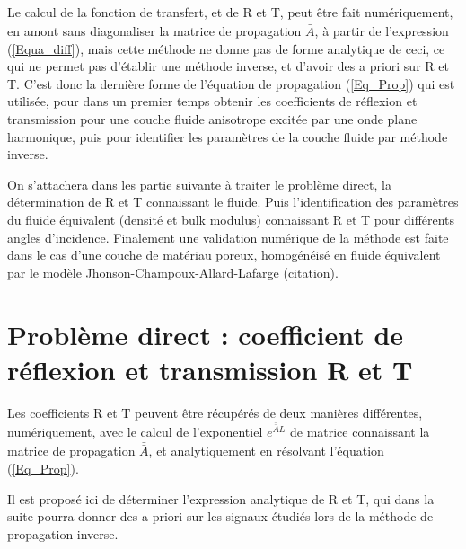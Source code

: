 \documentclass[12pt]{report}
\begin{document}
    Le calcul de la fonction de transfert, et de R et T, peut être fait numériquement, en amont sans diagonaliser la matrice de propagation $\bar{\bar{A}}$, à partir de l'expression (\ref{Equa_diff}), mais cette méthode ne donne pas de forme analytique de ceci, ce qui ne permet pas d'établir une méthode inverse, et d'avoir des a priori sur R et T. C'est donc la dernière forme de l'équation de propagation (\ref{Eq_Prop}) qui est utilisée, pour dans un premier temps obtenir les coefficients de réflexion et transmission pour une couche fluide anisotrope excitée par une onde plane harmonique, puis pour identifier les paramètres de la couche fluide par méthode inverse.
    
    On s'attachera dans les partie suivante à traiter le problème direct, la détermination de R et T connaissant le fluide. Puis l'identification des paramètres du fluide équivalent (densité et bulk modulus) connaissant R et T pour différents angles d'incidence. Finalement une validation numérique de la méthode est faite dans le cas d'une couche de matériau poreux, homogénéisé en fluide équivalent par le modèle Jhonson-Champoux-Allard-Lafarge (citation). 
    
\chapter{Problème direct : coefficient de réflexion et transmission R et T}
\label{Ch_Dir}
    Les  coefficients R et T peuvent être récupérés de deux manières différentes, numériquement, avec le calcul de l'exponentiel $e^{\bar{\bar{A}}L}$ de matrice connaissant la matrice de propagation $\bar{\bar{A}}$, et analytiquement en résolvant l'équation (\ref{Eq_Prop}).
    
    Il est proposé ici de déterminer l'expression analytique de R et T, qui dans la suite  pourra donner des a priori sur les signaux étudiés lors de la méthode de propagation inverse. 
\end{document}
